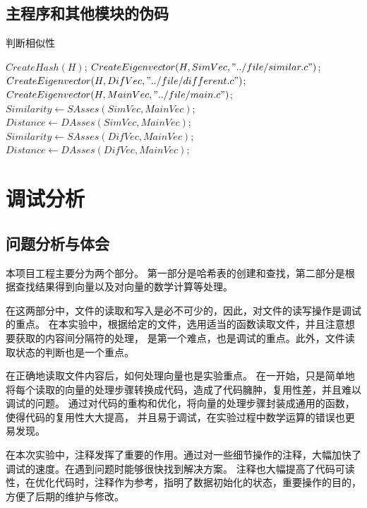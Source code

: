 \documentclass[a4paper]{article}
\begin{document}
	\subsection{主程序和其他模块的伪码}\label{subsec:code2}
	\begin{algorithm}[H]
		\caption{判断相似性}
		\begin{algorithmic}[1] %
				\State $CreateHash(H)$;
				\State $CreateEigenvector(H, SimVec, "../file/similar.c")$;
				\State $CreateEigenvector(H, DifVec, "../file/different.c")$;
				\State $CreateEigenvector(H, MainVec, "../file/main.c")$;
				\State $Similarity \gets SAsses(SimVec, MainVec)$;
				\State $Distance \gets DAsses(SimVec, MainVec)$;
				\State $Similarity \gets SAsses(DifVec, MainVec)$;
				\State $Distance \gets DAsses(DifVec, MainVec)$;
			\EndFunction
		\end{algorithmic}\label{alg:algorithm6}
	\end{algorithm}


	\section{调试分析}\label{sec:debug}

	\subsection{问题分析与体会}\label{subsec:analysis}
	{{本项目工程主要分为两个部分。
	第一部分是哈希表的创建和查找，第二部分是根据查找结果得到向量以及对向量的数学计算等处理。}}

	{在这两部分中，文件的读取和写入是必不可少的，因此，对文件的读写操作是调试的重点。
	在本实验中，根据给定的文件，选用适当的函数读取文件，并且注意想要获取的内容间分隔符的处理，
	是第一个难点，也是调试的重点。此外，文件读取状态的判断也是一个重点。}

	{{在正确地读取文件内容后，如何处理向量也是实验重点。
	在一开始，只是简单地将每个读取的向量的处理步骤转换成代码，造成了代码臃肿，复用性差，并且难以调试的问题。
	通过对代码的重构和优化，将向量的处理步骤封装成通用的函数，使得代码的复用性大大提高，
	并且易于调试，在实验过程中数学运算的错误也更易发现。}}

	{{在本次实验中，注释发挥了重要的作用。通过对一些细节操作的注释，大幅加快了调试的速度。在遇到问题时能够很快找到解决方案。
	注释也大幅提高了代码可读性，在优化代码时，注释作为参考，指明了数据初始化的状态，重要操作的目的，方便了后期的维护与修改。}}
\end{document}
